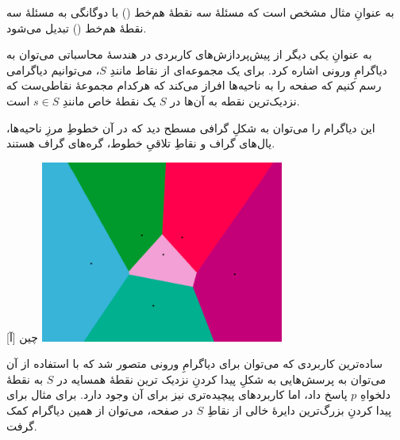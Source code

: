 به عنوانِ مثال مشخص است که مسئلهٔ سه‌ نقطهٔ هم‌خط () با دوگانگی به مسئلهٔ سه نقطهٔ هم‌خط () تبدیل می‌شود. 


به عنوانِ یکی دیگر از پیش‌پردازش‌های کاربردی در هندسهٔ محاسباتی می‌توان به دیاگرامِ ورونی اشاره کرد. برای یک مجموعه‌ای از نقاط مانندِ $S$، می‌توانیم دیاگرامی رسم کنیم که صفحه را به ناحیه‌ها افراز می‌کند که هرکدام مجموعهٔ نقاطی‌ست که نزدیک‌ترین نقطه به آن‌ها در $S$ یک نقطهٔ خاص مانندِ $s \in S$ است.

این دیاگرام را می‌توان به شکلِ گرافی مسطح دید که در آن خطوطِ مرزِ ناحیه‌ها، یال‌های گراف و نقاطِ تلاقیِ خطوط، گره‌های گراف هستند.

[آ]
‌چین
\includegraphics[width=0.6\textwidth]{figs/voronoi.png}


ساده‌ترین کاربردی که می‌توان برای دیاگرامِ ورونی متصور شد که با استفاده از آن می‌توان به پرسش‌هایی به شکلِ پیدا کردنِ نزدیک ترین نقطهٔ همسایه در $S$ به نقطهٔ دلخواهِ $p$ پاسخ داد، اما کاربردهای پیچیده‌تری نیز برای آن وجود دارد. برای مثال برای پیدا کردنِ بزرگ‌ترین دایرهٔ خالی از نقاطِ $S$ در صفحه، می‌توان از همین دیاگرام کمک گرفت. 